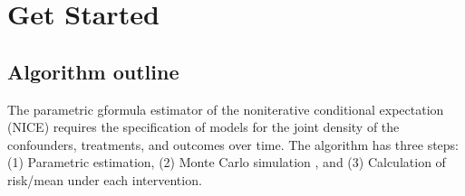 \documentclass[letterpaper,10pt,english]{sphinxmanual}
\begin{document}
\begin{sphinxVerbatim}[commandchars=\\\{\}]
  
\end{sphinxVerbatim}


\chapter{Get Started}
\label{\detokenize{Get Started:get-started}}\label{\detokenize{Get Started::doc}}

\section{Algorithm outline}
\label{\detokenize{Get Started:algorithm-outline}}
\sphinxAtStartPar
The parametric g\sphinxhyphen{}formula estimator of the noniterative conditional expectation (NICE) requires
the specification of models for the joint density of the confounders, treatments, and outcomes over time.
The algorithm has three steps: (1) Parametric estimation, (2) Monte Carlo simulation
, and (3) Calculation of risk/mean under each intervention.
\end{document}
